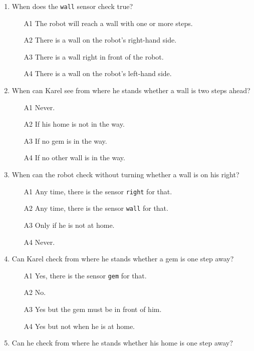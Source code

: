 {{{{\begin{enumerate}
\begin{enumerate}
\item[A3] Robot's home is straight ahead of the robot.
\item[A4] The robot needs to go home to drop all gems that he collected.
\end{enumerate}
\item When does the {\tt wall} sensor check true?
\begin{enumerate}
\item[A1] The robot will reach a wall with one or more steps. 
\item[A2] There is a wall on the robot's right-hand side.
\item[A3] There is a wall right in front of the robot.
\item[A4] There is a wall on the robot's left-hand side.
\end{enumerate}
\item When can Karel see from where he stands whether a wall is two steps ahead?
\begin{enumerate}
\item[A1] Never.
\item[A2] If his home is not in the way.
\item[A3] If no gem is in the way.
\item[A4] If no other wall is in the way.
\end{enumerate}
\item When can the robot check without turning whether a wall is on his right?
\begin{enumerate}
\item[A1] Any time, there is the sensor {\tt right} for that.
\item[A2] Any time, there is the sensor {\tt wall} for that.
\item[A3] Only if he is not at home.
\item[A4] Never.
\end{enumerate}
\item Can Karel check from where he stands whether a gem is one step away?
\begin{enumerate}
\item[A1] Yes, there is the sensor {\tt gem} for that.
\item[A2] No.
\item[A3] Yes but the gem must be in front of him.
\item[A4] Yes but not when he is at home.
\end{enumerate}
\item Can he check from where he stands whether his home is one step away?

\end{enumerate}}}}}
